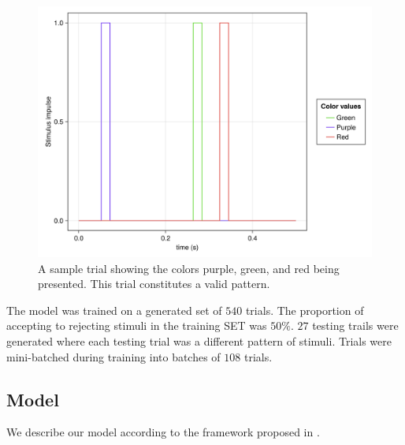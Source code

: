 \documentclass[conference]{IEEEtran}
\begin{document}
\begin{figure}[htbp]
\centerline{\includegraphics[scale=0.10]{example_trial.png}}
\caption{A sample trial showing the colors purple, green, and red being presented. This trial constitutes a valid pattern.}
\label{trial}
\end{figure}

The model was trained on a generated set of $540$ trials. The proportion of accepting to rejecting stimuli in the training SET was $50\%$. $27$ testing trails were generated where each testing trial was a different pattern of stimuli. Trials were mini-batched during training into batches of $108$ trials.

\subsection{Model}
\label{ctrnnmodel}

We describe our model according to the framework proposed in \cite{richards2019deep}.
\end{document}
